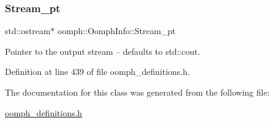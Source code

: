 \subsubsection{\texorpdfstring{Stream\+\_\+pt}{Stream\_pt}}
{\footnotesize\ttfamily std\+::ostream$\ast$ oomph\+::\+Oomph\+Info\+::\+Stream\+\_\+pt\hspace{0.3cm}{\ttfamily [private]}}



Pointer to the output stream -- defaults to std\+::cout. 



Definition at line 439 of file oomph\+\_\+definitions.\+h.



The documentation for this class was generated from the following file\+:\begin{DoxyCompactItemize}
\item 
\hyperlink{oomph__definitions_8h}{oomph\+\_\+definitions.\+h}\end{DoxyCompactItemize}
